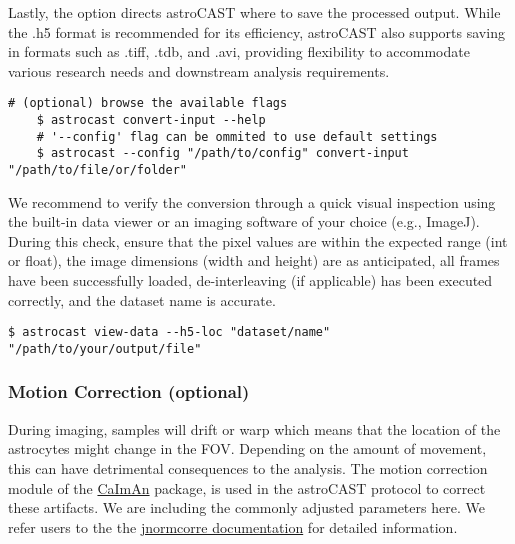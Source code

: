 Lastly, the  option directs astroCAST where to save the processed output. While the .h5 format is recommended for its efficiency, astroCAST also supports saving in formats such as .tiff, .tdb, and .avi, providing flexibility to accommodate various research needs and downstream analysis requirements.

\begin{lstlisting}[style=bashStyle]
    # (optional) browse the available flags
    $ astrocast convert-input --help
    # '--config' flag can be ommited to use default settings
    $ astrocast --config "/path/to/config" convert-input "/path/to/file/or/folder"
\end{lstlisting}

We recommend to verify the conversion through a quick visual inspection using the built-in data viewer or an imaging software of your choice (e.g., ImageJ). During this check, ensure that the pixel values are within the expected range (int or float), the image dimensions (width and height) are as anticipated, all frames have been successfully loaded, de-interleaving (if applicable) has been executed correctly, and the dataset name is accurate.

\begin{lstlisting}[style=bashStyle]
    $ astrocast view-data --h5-loc "dataset/name" "/path/to/your/output/file"
\end{lstlisting}

\subsubsection{Motion Correction (optional)}

During imaging, samples will drift or warp which means that the location of the astrocytes might change in the \ac{FOV}. Depending on the amount of movement, this can have detrimental consequences to the analysis. The motion correction module of the \href{https://github.com/flatironinstitute/CaImAn}{CaImAn} package\citep{giovannucci_caiman_2019}, is used in the astroCAST protocol to correct these artifacts. We are including the commonly adjusted parameters here. We refer users to the the \href{https://jnormcorre.readthedocs.io/en/latest/Algo.html#motion-correction-methods}{jnormcorre documentation} for detailed information.

